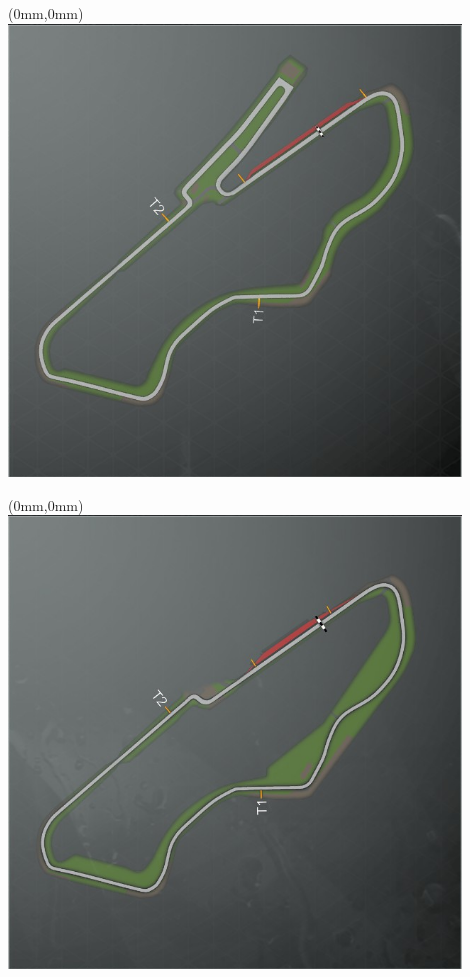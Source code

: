 \null\newpage
\begin{textblock*}{30mm}(0mm,0mm)%
\includegraphics[width=120mm]{TR/2015-05-20_00022.png}
\end{textblock*}
\null\newpage
\begin{textblock*}{30mm}(0mm,0mm)%
\includegraphics[width=120mm]{TR/2015-05-20_00023.png}
\end{textblock*}

